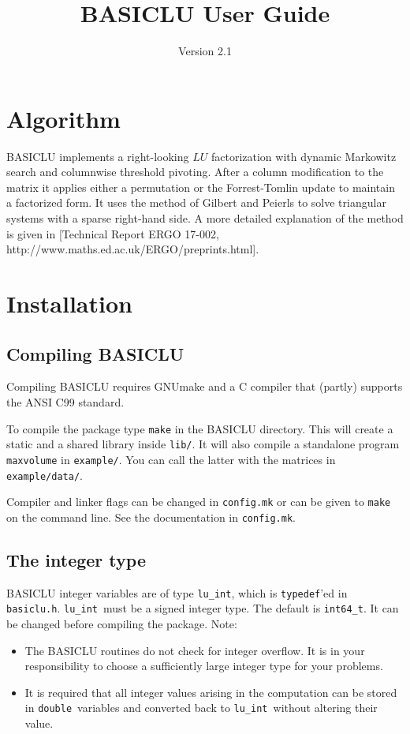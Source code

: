 \documentclass{article}
\title{BASICLU User Guide}
\author{Version 2.1}
\newcommand{\ct}{\texttt}
\newcommand{\luint}{\ct{lu\_int}}
\newcommand{\double}{\ct{double}}
\begin{document}
\maketitle

\tableofcontents
\newpage

\section{Algorithm}
BASICLU implements a right-looking $LU$ factorization with dynamic Markowitz
search and columnwise threshold pivoting. After a column modification to the
matrix it applies either a permutation or the Forrest-Tomlin update to maintain
a factorized form. It uses the method of Gilbert and Peierls to solve triangular
systems with a sparse right-hand side. A more detailed explanation of the method
is given in [Technical Report ERGO 17-002,
http://www.maths.ed.ac.uk/ERGO/preprints.html].

\section{Installation}
\subsection{Compiling BASICLU}
Compiling BASICLU requires GNUmake and a C compiler that (partly) supports the
ANSI C99 standard.

To compile the package type \ct{make} in the BASICLU directory. This will create
a static and a shared library inside \ct{lib/}. It will also compile a
standalone program \ct{maxvolume} in \ct{example/}. You can call the latter with
the matrices in \ct{example/data/}.

Compiler and linker flags can be changed in \ct{config.mk} or can be given to
\ct{make} on the command line. See the documentation in \ct{config.mk}.

\subsection{The integer type}
BASICLU integer variables are of type \luint, which is \ct{typedef}'ed in
\ct{basiclu.h}. \luint\ must be a signed integer type. The default is
\ct{int64\_t}. It can be changed before compiling the package. Note:
\begin{itemize}
\item The BASICLU routines do not check for integer overflow. It is in your
  responsibility to choose a sufficiently large integer type for your problems.
\item It is required that all integer values arising in the computation can be
  stored in \double\ variables and converted back to \luint\ without altering
  their value.
\end{itemize}
\end{document}
